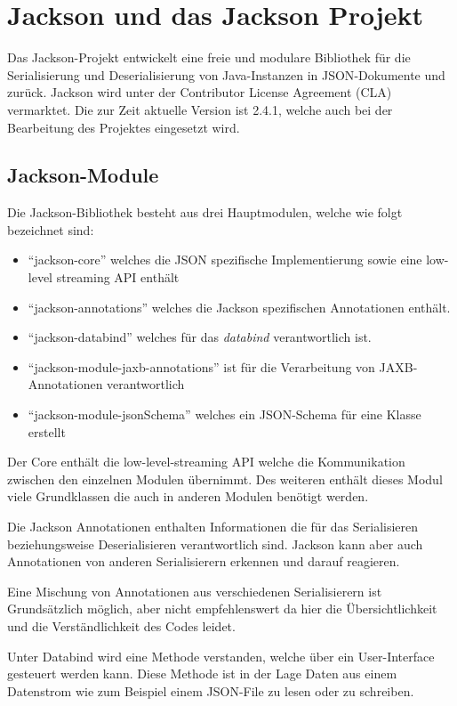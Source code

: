 \section{Jackson und das Jackson Projekt}\label{Jackson}
Das Jackson-Projekt entwickelt eine freie und modulare Bibliothek f\"ur die Serialisierung und Deserialisierung von Java-Instanzen in \ac{JSON}-Dokumente und zur\"uck. Jackson wird unter der Contributor License Agreement (CLA) vermarktet. Die zur Zeit aktuelle Version ist 2.4.1, welche auch bei der Bearbeitung des Projektes eingesetzt wird.

\subsection{Jackson-Module}
Die Jackson-Bibliothek besteht aus drei Hauptmodulen, welche wie folgt bezeichnet sind:
\begin{itemize}
 \item "`jackson-core"' welches die JSON spezifische Implementierung sowie eine low-level streaming API enth\"alt 
 \item "`jackson-annotations"' welches die Jackson spezifischen Annotationen enth\"alt.
 \item "`jackson-databind"' welches f\"ur das \textit{databind} verantwortlich ist.
 \item "`jackson-module-jaxb-annotations"' ist f\"ur die Verarbeitung von JAXB-Annotationen verantwortlich
 \item "`jackson-module-jsonSchema"' welches ein JSON-Schema f\"ur eine Klasse erstellt
\end{itemize}
Der Core enth\"alt die low-level-streaming API welche die Kommunikation zwischen den einzelnen Modulen \"ubernimmt. Des weiteren enth\"alt dieses Modul viele Grundklassen die auch in anderen Modulen ben\"otigt werden.

Die Jackson Annotationen enthalten Informationen die f\"ur das Serialisieren beziehungsweise Deserialisieren verantwortlich sind.
Jackson kann aber auch Annotationen von anderen Serialisierern erkennen und darauf reagieren.

Eine Mischung von Annotationen aus verschiedenen Serialisierern ist Grunds\"atzlich m\"oglich, aber nicht empfehlenswert da hier die \"Ubersichtlichkeit und die Verst\"andlichkeit des Codes leidet.

Unter Databind wird eine Methode verstanden, welche \"uber ein User-Interface gesteuert werden kann.
Diese Methode ist in der Lage Daten aus einem Datenstrom wie zum Beispiel einem JSON-File zu lesen oder zu schreiben.

